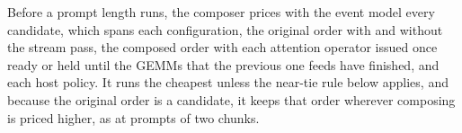 Before a prompt length runs, the composer prices with the event model every candidate, which spans each configuration, the original order with and without the stream pass, the composed order with each attention operator issued once ready or held until the GEMMs that the previous one feeds have finished, and each host policy.
It runs the cheapest unless the near-tie rule below applies, and because the original order is a candidate, it keeps that order wherever composing is priced higher, as at prompts of two chunks.

